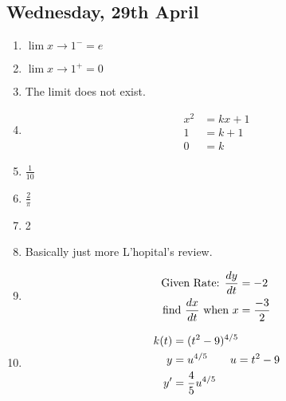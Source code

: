 \documentclass[11pt]{article}
\begin{document}
\subsection{Wednesday, 29th April}
\begin{enumerate}
	\item $ \lim{x \to 1^-} = e$
	\item $\lim x \to 1^+ = 0$
	\item The limit does not exist.
	\item \begin{align*}
			x^2 &= kx + 1\\
			1 &= k + 1\\
			0 &= k
		\end{align*}
	\item \(\frac{1}{10}\)
	\item \(\frac{2}{\pi}\)
	\item 2
	\item Basically just more L'hopital's review.
	\item \begin{align}
			\setcounter{equation}{0}
			\text{Given Rate:  }\frac{dy}{dt} &= -2\\
			\text{find }\frac{dx}{dt}\text{ when }x &= \frac{-3}{2}
		\end{align}
	\item \begin{align}
			\setcounter{equation}{0}
			k(t) &= (t^2-9)^{4/5}\\
			y &= u^{4/5} \qquad u = t^2 - 9\\
			y^{\prime} &= \frac{4}{5} u^{4/5}\\
		\end{align}
\end{enumerate}
\end{document}
